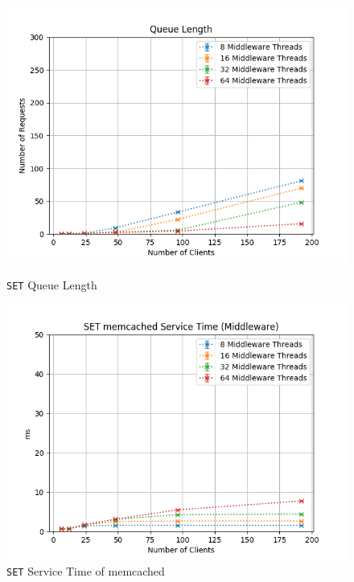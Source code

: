 \documentclass[11pt,a4paper]{article}
\begin{document}
\begin{figure}[H]
	\centering
    \begin{minipage}{0.5\textwidth}
        \includegraphics[width=\textwidth]{../illustrations/plots/2_2_two_middlewares/1-0/middleware_queue_length.png}
        \caption{\texttt{SET} Queue Length}
        \label{fig:two_middlewares_set_ql}
    \end{minipage}\hfill
    \begin{minipage}{0.5\textwidth}
        \centering
        \includegraphics[width=\textwidth]{../illustrations/plots/2_2_two_middlewares/1-0/middleware_set_service_time_ms.png}
        \caption{\texttt{SET} Service Time of memcached}
        \label{fig:two_middlewares_set_st_mw}
    \end{minipage}
\end{figure}
\end{document}
